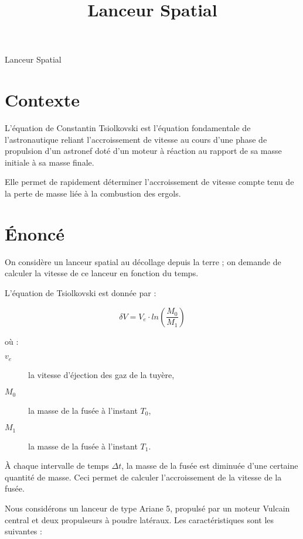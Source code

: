 \documentclass[french,a4paper,addpoints,11pt]{exam}
\title{Lanceur Spatial}
\begin{document}
\maketitle

    \begin{questions}
        \begin{multicols}{2}
        \question Lanceur Spatial

        \section*{Contexte}

        L'équation de Constantin Tsiolkovski est l'équation fondamentale de l'astronautique reliant l'accroissement de vitesse au cours d'une phase de propulsion d'un astronef doté d'un moteur à réaction au rapport de sa masse initiale à sa masse finale.

        Elle permet de rapidement déterminer l'accroissement de vitesse compte tenu de la perte de masse liée à la combustion des ergols.
        \section*{Énoncé}

        On considère un lanceur spatial au décollage depuis la terre ; on demande de calculer la vitesse de ce lanceur en fonction du temps.

        L'équation de Tsiolkovski est donnée par :

        \begin{equation}
            \delta V = V_e \cdot ln(\frac{M_0}{M_1})
        \end{equation}

        où :

        \begin{description}
            \item[$v_e$] la vitesse d'éjection des gaz de la tuyère,
            \item[$M_0$] la masse de la fusée à l'instant $T_{0}$,
            \item[$M_1$] la masse de la fusée à l'instant $T_{1}$.
        \end{description}

        À chaque intervalle de temps $\Delta t$, la masse de la fusée est diminuée d'une certaine quantité de masse. Ceci permet de calculer l'accroissement de la vitesse de la fusée.

        Nous considérons un lanceur de type Ariane 5, propulsé par un moteur Vulcain central et deux propulseurs à poudre latéraux. Les caractéristiques sont les suivantes :


\end{multicols}
\end{questions}
\end{document}
